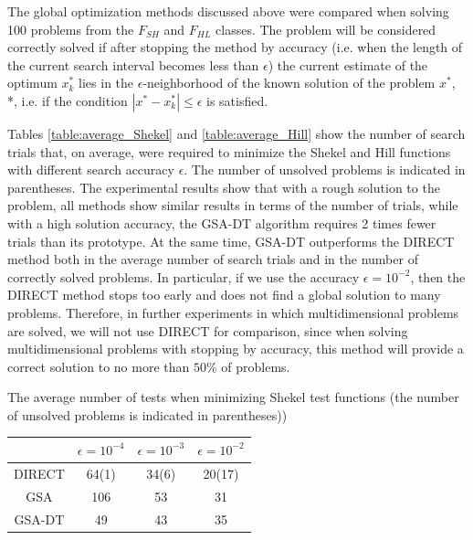 \documentclass[entropy,article,submit,moreauthors,pdftex]{Definitions/mdpi}
\begin{document}
The global optimization methods discussed above were compared when solving 100 problems from the  $F_{SH}$ and $F_{HL}$ classes. The problem will be considered correctly solved if after stopping the method by accuracy (i.e. when the length of the current search interval becomes less than $\epsilon$) the current estimate of the optimum  $x_k^*$ lies in the $\epsilon$-neighborhood of the known solution of the problem  $x^*$, *, i.e. if the condition  $|x^*-x_k^*| \leq \epsilon$ is satisfied.

Tables \ref{table:average_Shekel} and \ref{table:average_Hill} show the number of search trials that, on average, were required to minimize the Shekel and Hill functions with different search accuracy  $\epsilon$. The number of unsolved problems is indicated in parentheses. The experimental results show that with a rough solution to the problem, all methods show similar results in terms of the number of trials, while with a high solution accuracy, the GSA-DT algorithm requires 2 times fewer trials than its prototype. At the same time, GSA-DT outperforms the DIRECT method both in the average number of search trials and in the number of correctly solved problems. In particular, if we use the accuracy $\epsilon = 10^{-2}$, then the DIRECT method stops too early and does not find a global solution to many problems. 
Therefore, in further experiments in which multidimensional problems are solved, we will not use DIRECT for comparison, since when solving multidimensional problems with stopping by accuracy, this method will provide a correct solution to no more than  $50\%$ of problems. 

\begin{specialtable}[H] 
	\caption{The average number of tests when minimizing Shekel test functions (the number of unsolved problems is indicated in parentheses))}\label{table:average_Shekel}
	\center
\begin{tabular}{cccc}
\toprule
        & \textbf{$\epsilon = 10^{-4}$} & \textbf{$\epsilon = 10^{-3}$} & \textbf{$\epsilon = 10^{-2}$} \\
\midrule													
DIRECT         & 64(1) &  34(6)   & 20(17)    \\
GSA            & 106  & 53  &  31   \\ 
GSA-DT         & 49   & 43  &  35   \\

\bottomrule
\end{tabular}
\end{specialtable}
\end{document}
